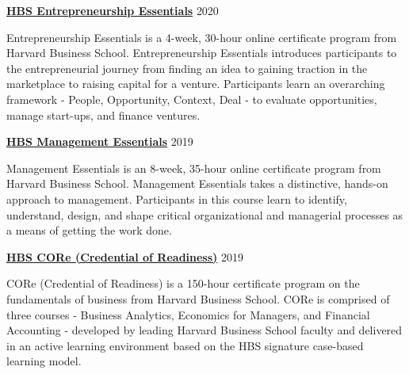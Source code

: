 \documentclass[margin,line]{res}
\begin{document}
\begin{resume}
{\bf \href{https://online.hbs.edu/courses/entrepreneurship-essentials/}{HBS Entrepreneurship Essentials}} \hfill {2020}\\
\vspace*{-3.5mm}
\begin{addmargin}[0pt]{.1\linewidth}
\vspace*{-1mm}
Entrepreneurship Essentials is a 4-week, 30-hour online certificate program from Harvard Business School. Entrepreneurship Essentials introduces participants to the entrepreneurial journey from finding an idea to gaining traction in the marketplace to raising capital for a venture. Participants learn an overarching framework - People, Opportunity, Context, Deal - to evaluate opportunities, manage start-ups, and finance ventures.
\end{addmargin}

\vspace*{-2mm}

{\bf \href{https://online.hbs.edu/courses/management-essentials/}{HBS Management Essentials}} \hfill {2019}\\
\vspace*{-3.5mm}
\begin{addmargin}[0pt]{.1\linewidth}
\vspace*{-1mm}
Management Essentials is an 8-week, 35-hour online certificate program from Harvard Business School. Management Essentials takes a distinctive, hands-on approach to management. Participants in this course learn to identify, understand, design, and shape critical organizational and managerial processes as a means of getting the work done.
\end{addmargin}

\vspace*{-2mm}

{\bf \href{https://online.hbs.edu/courses/core/}{HBS CORe (Credential of Readiness)}} \hfill {2019}\\
\vspace*{-3.5mm}
\begin{addmargin}[0pt]{.1\linewidth}
\vspace*{-1mm}
CORe (Credential of Readiness) is a 150-hour certificate program on the fundamentals of business from Harvard Business School. CORe is comprised of three courses - Business Analytics, Economics for Managers, and Financial Accounting - developed by leading Harvard Business School faculty and delivered in an active learning environment based on the HBS signature case-based learning model.
\end{addmargin}


\end{resume}
\end{document}
